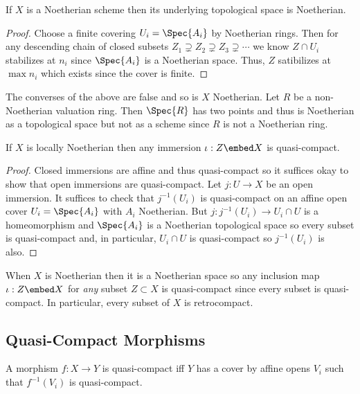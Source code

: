 \documentclass[12pt]{article}
\begin{document}
\begin{lemma}
If $X$ is a Noetherian scheme then its underlying topological space is Noetherian.
\end{lemma}

\begin{proof}
Choose a finite covering $U_i = \Spec{A_i}$ by Noetherian rings. Then for any descending chain of closed subsets $Z_1 \supsetneq Z_2 \supsetneq Z_3 \supsetneq \cdots$ we know $Z \cap U_i$ stabilizes at $n_i$ since $\Spec{A_i}$ is a Noetherian space. Thus, $Z$ satibilizes at $\max{n_i}$ which exists since the cover is finite. 
\end{proof}

\begin{rmk}
The converses of the above are false and so is $X$ Noetherian. Let $R$ be a non-Noetherian valuation ring. Then $\Spec{R}$ has two points and thus is Noetherian as a topological space but not as a scheme since $R$ is not a Noetherian ring. 
\end{rmk}

\begin{lemma}
If $X$ is locally Noetherian then any immersion $\iota : Z \embed X$ is quasi-compact.
\end{lemma}

\begin{proof}
Closed immersions are affine and thus quasi-compact so it suffices okay to show that open immersions are quasi-compact. Let $j : U \to X$ be an open immersion. It suffices to check that $j^{-1}(U_i)$ is quasi-compact on an affine open cover $U_i = \Spec{A_i}$ with $A_i$ Noetherian. But $j : j^{-1}(U_i) \to U_i \cap U$ is a homeomorphism and $\Spec{A_i}$ is a Noetherian topological space so every subset is quasi-compact and, in particular, $U_i \cap U$ is quasi-compact so $j^{-1}(U_i)$ is also.
\end{proof}

\begin{rmk}
When $X$ is Noetherian then it is a Noetherian space so any inclusion map $\iota : Z \embed X$ for \textit{any} subset $Z \subset X$ is quasi-compact since every subset is quasi-compact. In particular, every subset of $X$ is retrocompact. 
\end{rmk}

\subsection{Quasi-Compact Morphisms}

\begin{lemma}
A morphism $f : X \to Y$ is quasi-compact iff $Y$ has a cover by affine opens $V_i$ such that $f^{-1}(V_i)$ is quasi-compact.
\end{lemma}
\end{document}
